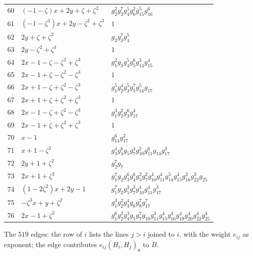 \documentclass[11pt]{article}
\begin{document}
{\begin{longtable}{@{}rll@{}}
60 & $(-1-\zeta)x+2 y+\zeta+\zeta^2$ & $g_{2}^{2}g_{3}^{7}g_{4}^{5}g_{6}^{2}g_{15}^{5}g_{16}^{6}$\\
61 & $(-1-\zeta^3)x+2 y-\zeta^2+\zeta^3$ & $1$\\
62 & $2 y+\zeta+\zeta^2$ & $g_{2}g_{3}^{7}g_{4}^{5}$\\
63 & $2 y-\zeta^2+\zeta^3$ & $1$\\
64 & $2 x-1-\zeta-\zeta^2+\zeta^3$ & $g_{1}^{2}g_{3}g_{4}^{5}g_{5}^{6}g_{14}^{3}g_{15}^{4}$\\
65 & $2 x-1+\zeta-\zeta^2-\zeta^3$ & $1$\\
66 & $2 x+1-\zeta+\zeta^2-\zeta^3$ & $g_{1}^{5}g_{2}^{4}g_{3}^{5}g_{5}^{7}g_{14}^{5}g_{17}$\\
67 & $2 x+1+\zeta+\zeta^2+\zeta^3$ & $1$\\
68 & $2 x-1-\zeta+\zeta^2-\zeta^3$ & $g_{1}^{3}g_{2}^{2}g_{3}^{6}g_{17}^{4}$\\
69 & $2 x-1+\zeta+\zeta^2+\zeta^3$ & $1$\\
70 & $x-1$ & $g_{14}^{6}g_{17}^{2}$\\
71 & $x+1-\zeta^2$ & $g_{3}^{4}g_{4}^{6}g_{5}g_{7}^{4}g_{10}^{2}g_{11}^{6}g_{14}g_{17}^{3}$\\
72 & $2 y+1+\zeta^2$ & $g_{2}^{7}g_{7}$\\
73 & $2 x+1+\zeta^2$ & $g_{1}^{7}g_{2}g_{3}^{6}g_{4}^{6}g_{5}^{2}g_{7}^{2}g_{10}^{4}g_{11}^{4}g_{14}^{5}g_{15}^{4}g_{16}^{2}g_{22}^{3}g_{25}$\\
74 & $(1-2\zeta^2)x+2 y-1$ & $g_{1}^{7}g_{2}g_{5}^{3}g_{7}^{3}g_{10}^{4}g_{11}^{4}g_{17}^{3}$\\
75 & $-\zeta^3 x+y+\zeta^2$ & $g_{1}^{3}g_{2}^{2}g_{3}^{4}g_{6}g_{8}^{7}g_{17}^{7}$\\
76 & $2 x-1+\zeta^2$ & $g_{1}^{6}g_{2}^{2}g_{4}^{3}g_{5}g_{7}^{7}g_{10}g_{11}^{3}g_{15}^{4}g_{16}^{4}g_{19}^{4}g_{20}^{4}g_{22}^{4}g_{25}^{4}$\\
\end{longtable}
}

\noindent The $519$ edges: the row of $i$ lists the lines $j>i$ joined to $i$, with the weight $e_{ij}$ as exponent; the edge contributes $e_{ij}(H_i,H_j)_8$ to $B$.
\end{document}
